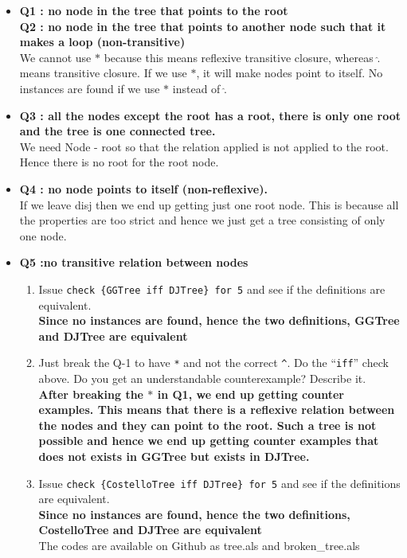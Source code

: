 \documentclass[11pt]{article}
\begin{document}
\begin{enumerate}
\begin{itemize}
\item[] 
\textbf{Q1 :  no node in the tree that points to the root}\\
\textbf{Q2 :  no node in the tree that points to another node such that it makes a loop (non-transitive)}
\\
We cannot use $*$ because this means reflexive transitive closure, whereas $\hat{.}$ means transitive closure. If we use $*$, it will make nodes point to itself. No instances are found if we use $*$ instead of $\hat{.}$



\item[] 
\textbf{Q3 : all the nodes except the root has a root, there is only one root and the tree is one connected tree.}\\ We need Node - root so that the relation applied is not applied to the root. Hence there is no root for the root node.
\item[] 
\textbf{Q4 : no node points to itself (non-reflexive).}\\
If we leave disj then we end up getting just one root node. This is because all the properties are too strict and hence we just get a tree consisting of only one node.


\item[]
\textbf{Q5 :no transitive relation between nodes}
\begin{enumerate}
\item Issue \verb|check {GGTree iff DJTree} for 5| and see if the definitions are equivalent.\\
\textbf{Since no instances are found, hence the two definitions, GGTree and DJTree are equivalent}
\item Just break the Q-1 to have \verb|*| and not the correct \verb|^|. Do the ``\verb|iff|''  check above.
Do you get an understandable counterexample? Describe it.\\
\textbf{After breaking the $*$ in Q1, we end up getting counter examples. This means that there is a reflexive relation between the nodes and they can point to the root. Such a tree is not possible and hence we end up getting counter examples that does not exists in GGTree but exists in DJTree.}
\item Issue \verb|check {CostelloTree iff DJTree} for 5| and see if the definitions are equivalent.\\
\textbf{Since no instances are found, hence the two definitions, CostelloTree and DJTree are equivalent}
\\
The codes are available on Github as tree.als and broken\_tree.als
\end{enumerate}


\end{itemize}
\end{enumerate}
\end{document}
